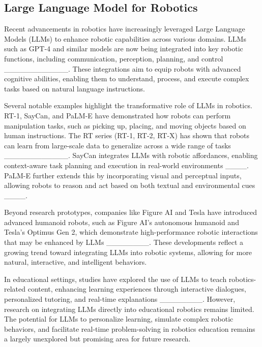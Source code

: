 \subsection{Large Language Model for Robotics}

Recent advancements in robotics have increasingly leveraged Large Language Models (LLMs) to enhance robotic capabilities across various domains. LLMs such as GPT-4 and similar models are now being integrated into key robotic functions, including communication, perception, planning, and control ____________. These integrations aim to equip robots with advanced cognitive abilities, enabling them to understand, process, and execute complex tasks based on natural language instructions.

Several notable examples highlight the transformative role of LLMs in robotics. RT-1, SayCan, and PaLM-E have demonstrated how robots can perform manipulation tasks, such as picking up, placing, and moving objects based on human instructions. The RT series (RT-1, RT-2, RT-X) has shown that robots can learn from large-scale data to generalize across a wide range of tasks ____________. SayCan integrates LLMs with robotic affordances, enabling context-aware task planning and execution in real-world environments ____. PaLM-E further extends this by incorporating visual and perceptual inputs, allowing robots to reason and act based on both textual and environmental cues ____.

Beyond research prototypes, companies like Figure AI and Tesla have introduced advanced humanoid robots, such as Figure AI’s autonomous humanoid and Tesla’s Optimus Gen 2, which demonstrate high-performance robotic interactions that may be enhanced by LLMs ________. These developments reflect a growing trend toward integrating LLMs into robotic systems, allowing for more natural, interactive, and intelligent behaviors.

In educational settings, studies have explored the use of LLMs to teach robotics-related content, enhancing learning experiences through interactive dialogues, personalized tutoring, and real-time explanations ________. However, research on integrating LLMs directly into educational robotics remains limited. The potential for LLMs to personalize learning, simulate complex robotic behaviors, and facilitate real-time problem-solving in robotics education remains a largely unexplored but promising area for future research.